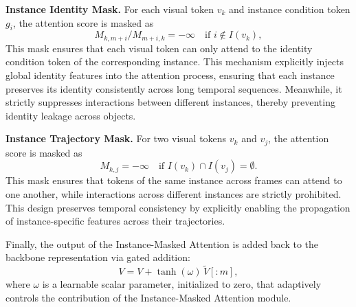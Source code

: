 \documentclass{article} %
\begin{document}
\noindent\textbf{Instance Identity Mask.}  
For each visual token $v_k$ and instance condition token $g_i$, the attention score is masked as
\[
    M_{k,m+i} / M_{m+i,k} = -\infty \quad \text{if } i \notin I(v_k),
\]
This mask ensures that each visual token can only attend to the identity condition token of the corresponding instance.  
This mechanism explicitly injects global identity features into the attention process, ensuring that each instance preserves its identity consistently across long temporal sequences.  
Meanwhile, it strictly suppresses interactions between different instances, thereby preventing identity leakage across objects.  

\noindent\textbf{Instance Trajectory Mask.}  
For two visual tokens $v_k$ and $v_j$, the attention score is masked as
\[
    M_{k,j} = -\infty \quad \text{if } I(v_k) \cap I(v_j) = \emptyset.
\]
This mask ensures that tokens of the same instance across frames can attend to one another, while interactions across different instances are strictly prohibited. 
This design preserves temporal consistency by explicitly enabling the propagation of instance-specific features across their trajectories. 




Finally, the output of the Instance-Masked Attention is added back to the backbone representation via gated addition:
\begin{equation}
    V = V + \tanh(\omega)\,\tilde{V}[:m],
\end{equation}
where $\omega$ is a learnable scalar parameter, initialized to zero, that adaptively controls the contribution of the Instance-Masked Attention module.  

















\end{document}
